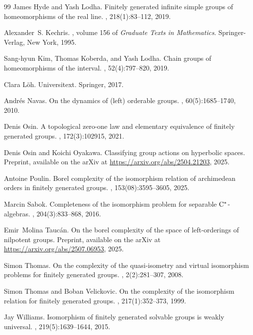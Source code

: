 \documentclass{amsart}
\theoremstyle{definition}
\theoremstyle{remark}
\begin{document}
\begin{thebibliography}{99}
James Hyde and Yash Lodha.
\newblock Finitely generated infinite simple groups of homeomorphisms of the real line.
, 218(1):83--112, 2019.

Alexander~S. Kechris.
, volume 156 of {\em Graduate Texts in Mathematics}.
\newblock Springer-Verlag, New York, 1995.

Sang-hyun Kim, Thomas Koberda, and Yash Lodha.
\newblock Chain groups of homeomorphisms of the interval.
, 52(4):797--820, 2019.

Clara L{\"o}h.
\newblock Universitext. Springer, 2017.

Andr\'{e}s Navas.
\newblock On the dynamics of (left) orderable groups.
, 60(5):1685--1740, 2010.

Denis Osin.
\newblock A topological zero-one law and elementary equivalence of finitely generated groups.
, 172(3):102915, 2021.

Denis Osin and Koichi Oyakawa.
\newblock Classifying group actions on hyperbolic spaces.
\newblock Preprint, available on the arXiv at \url{https://arxiv.org/abs/2504.21203}, 2025.

Antoine Poulin.
\newblock Borel complexity of the isomorphism relation of archimedean orders in finitely generated groups.
, 153(08):3595--3605, 2025.

Marcin Sabok.
\newblock Completeness of the isomorphism problem for separable {$\rm C^\ast$}-algebras.
, 204(3):833--868, 2016.

Emir~Molina Tauc\'an.
\newblock On the borel complexity of the space of left-orderings of nilpotent groups.
\newblock Preprint, available on the arXiv at \url{https://arxiv.org/abs/2507.06953}, 2025.

Simon Thomas.
\newblock On the complexity of the quasi-isometry and virtual isomorphism problems for finitely generated groups.
, 2(2):281--307, 2008.

Simon Thomas and Boban Velickovic.
\newblock On the complexity of the isomorphism relation for finitely generated groups.
, 217(1):352--373, 1999.

Jay Williams.
\newblock Isomorphism of finitely generated solvable groups is weakly universal.
, 219(5):1639--1644, 2015.

\end{thebibliography}
\end{document}
